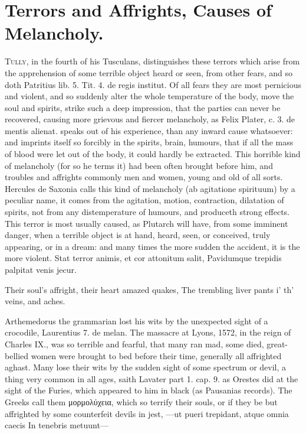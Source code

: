 {\section{Terrors and Affrights, Causes of Melancholy.}\label{sec:terrors-and-affrights}

\lettrine{T}{ully}, in the fourth of his Tusculans, distinguishes these terrors
which arise from the apprehension of some terrible object heard or
seen, from other fears, and so doth Patritius lib. 5. Tit. 4. de regis
institut. Of all fears they are most pernicious and violent, and so
suddenly alter the whole temperature of the body, move the soul and
spirits, strike such a deep impression, that the parties can never be
recovered, causing more grievous and fiercer melancholy, as Felix
Plater, c. 3. de mentis alienat. speaks out of his experience,
than any inward cause whatsoever: and imprints itself so forcibly in
the spirits, brain, humours, that if all the mass of blood were let out
of the body, it could hardly be extracted. This horrible kind of
melancholy (for so he terms it) had been often brought before him, and
troubles and affrights commonly men and women, young and old of all
sorts. Hercules de Saxonia calls this kind of melancholy (ab
agitatione spirituum) by a peculiar name, it comes from the agitation,
motion, contraction, dilatation of spirits, not from any distemperature
of humours, and produceth strong effects. This terror is most usually
caused, as Plutarch will have, from some imminent danger, when a
terrible object is at hand, heard, seen, or conceived, truly
appearing, or in a dream: and many times the more sudden the
accident, it is the more violent.
Stat terror animis, et cor attonitum salit,
Pavidumque trepidis palpitat venis jecur.

Their soul's affright, their heart amazed quakes,
The trembling liver pants i' th' veins, and aches.

Arthemedorus the grammarian lost his wits by the unexpected sight of a
crocodile, Laurentius 7. de melan. The massacre at Lyons, 1572,
in the reign of Charles IX., was so terrible and fearful, that many ran
mad, some died, great-bellied women were brought to bed before their
time, generally all affrighted aghast. Many lose their wits by
the sudden sight of some spectrum or devil, a thing very common in all
ages, saith Lavater part 1. cap. 9. as Orestes did at the sight of the
Furies, which appeared to him in black (as Pausanias records).
The Greeks call them \textgreek{μορμολύχεια}, which so terrify their souls, or if
they be but affrighted by some counterfeit devils in jest,
---ut pueri trepidant, atque omnia caecis
In tenebris metuunt---

}
